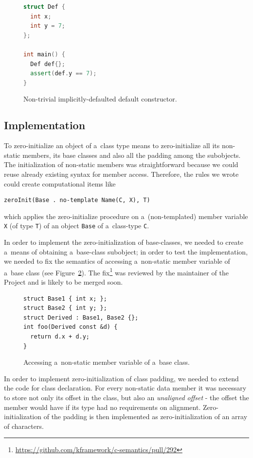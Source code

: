 \documentclass[nolot,nolof,nocover,printed]{fithesis3}
\begin{document}
\begin{figure}[ht]
\begin{lstlisting}[language=c++]
struct Def {
  int x;
  int y = 7;
};

int main() {
  Def def{};
  assert(def.y == 7);
}
\end{lstlisting}
\caption{Non-trivial implicitly-defaulted default constructor.}
\label{fig:defaultCtor}
\end{figure}

\subsection{Implementation}

To zero-initialize an object of a~class type means to zero-initialize all its non-static members, its base classes and also all the padding among the subobjects. The initialization of non-static members was straightforward because we could reuse already existing syntax for member access. Therefore, the rules we wrote could create computational items like
\begin{lstlisting}
zeroInit(Base . no-template Name(C, X), T)
\end{lstlisting}
which applies the zero-initialize procedure on a~(non-templated) member variable \lstinline|X| (of type \lstinline|T|) of an object \lstinline|Base| of a~class-type \lstinline|C|.

In order to implement the zero-initialization of base-classes, we needed to create a~means of obtaining a~base-class subobject; in order to test the implementation, we needed to fix the semantics of accessing a~non-static member variable of a~base class (see Figure~\ref{fig:baseClassMemberAccess}). The fix\footnote{\url{https://github.com/kframework/c-semantics/pull/292}} was reviewed by the maintainer of the Project and is likely to be merged soon.

\begin{figure}[ht]
\begin{lstlisting}
struct Base1 { int x; };
struct Base2 { int y; };
struct Derived : Base1, Base2 {};
int foo(Derived const &d) {
  return d.x + d.y;
}
\end{lstlisting}
\caption{Accessing a~non-static member variable of a~base class.}
\label{fig:baseClassMemberAccess}
\end{figure}

In order to implement zero-initialization of class padding, we needed to extend the code for class declaration. For every non-static data member it was necessary to store not only its offset in the class, but also an \textit{unaligned offset} - the offset the member would have if its type had no requirements on alignment. Zero-initialization of the padding is then implemented as zero-initialization of an array of characters.
\end{document}
